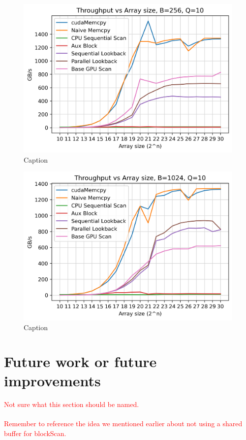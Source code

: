 \documentclass[twocolumn]{article}
\newcommand{\note}[1]{\textcolor{red}{#1}\\}
\begin{document}
\begin{figure}
    \centering
    \includegraphics[width=\linewidth]{report/plots/throughput_vs_array_size_B256_Q10.png}
    \caption{Caption}
    \label{fig:enter-label}
\end{figure}

\begin{figure}
    \centering
    \includegraphics[width=\linewidth]{report/plots/throughput_vs_array_size_B1024_Q10.png}
    \caption{Caption}
    \label{fig:enter-label}
\end{figure}

\section{Future work or future improvements}
\note{Not sure what this section should be named.\\}
\note{Remember to reference the idea we mentioned earlier about not using a shared buffer for blockScan.}
\end{document}
